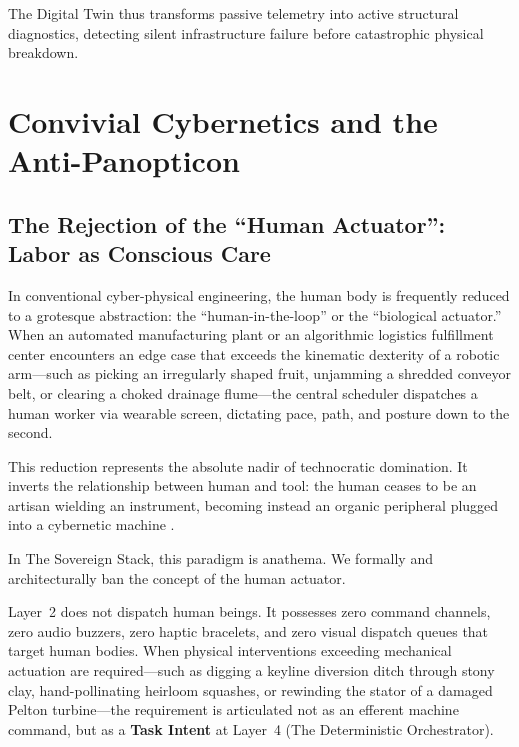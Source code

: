 The Digital Twin thus transforms passive telemetry into active structural diagnostics, detecting silent infrastructure failure before catastrophic physical breakdown.

\section{Convivial Cybernetics and the Anti-Panopticon}
\label{sec:l2_convivial_cybernetics}

\subsection{The Rejection of the ``Human Actuator'': Labor as Conscious Care}

In conventional cyber-physical engineering, the human body is frequently reduced to a grotesque abstraction: the ``human-in-the-loop'' or the ``biological actuator.'' When an automated manufacturing plant or an algorithmic logistics fulfillment center encounters an edge case that exceeds the kinematic dexterity of a robotic arm---such as picking an irregularly shaped fruit, unjamming a shredded conveyor belt, or clearing a choked drainage flume---the central scheduler dispatches a human worker via wearable screen, dictating pace, path, and posture down to the second.

This reduction represents the absolute nadir of technocratic domination. It inverts the relationship between human and tool: the human ceases to be an artisan wielding an instrument, becoming instead an organic peripheral plugged into a cybernetic machine \parencite{wiener1954}.

In The Sovereign Stack, this paradigm is anathema. We formally and architecturally ban the concept of the human actuator. 

Layer~2 does not dispatch human beings. It possesses zero command channels, zero audio buzzers, zero haptic bracelets, and zero visual dispatch queues that target human bodies. When physical interventions exceeding mechanical actuation are required---such as digging a keyline diversion ditch through stony clay, hand-pollinating heirloom squashes, or rewinding the stator of a damaged Pelton turbine---the requirement is articulated not as an efferent machine command, but as a \textbf{Task Intent} at Layer~4 (The Deterministic Orchestrator). 

